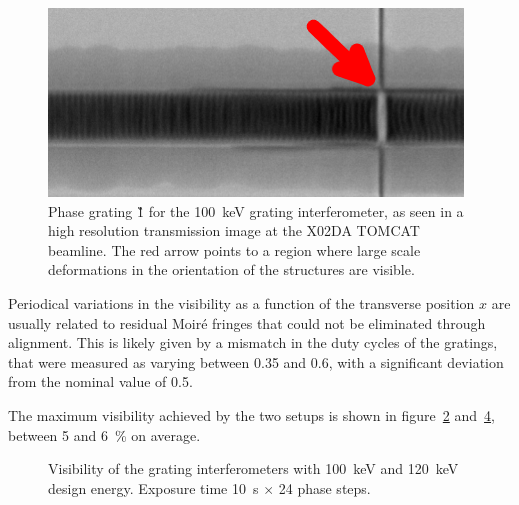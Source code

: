 \begin{figure}[htb]
    \centering
    \includegraphics[width=\textwidth]{gfx/mythen-edge-on/tomcat-grating.png}
    \caption{Phase grating \G1 for the \SI{100}{\kilo\eV} grating
interferometer, as seen in a high resolution transmission image at the X02DA
TOMCAT beamline. The red arrow points to a region where large scale
deformations in the orientation of the structures are visible.}
    \label{fig:defects-tomcat}
\end{figure}

Periodical variations in the visibility as a function of the transverse
position $x$ are usually related to residual Moir\'e fringes that could not
be eliminated through alignment. This is likely given by a mismatch in the
duty cycles of the gratings, that were measured as varying between 
\num{0.35} and \num{0.6}, with a significant deviation from the nominal value
of \num{0.5}.

The maximum visibility achieved by the two setups is shown in 
figure~\ref{fig:visibility100} and~\ref{fig:visibility120}, between \num{5} and
\SI{6}{\percent} on average.

\begin{figure}[h!]
    \centering
    \begin{subfigure}[b]{.49\textwidth}
        \resizebox{\textwidth}{!}{}
        \caption{}
        \label{fig:visibility100}
    \end{subfigure}
    \begin{subfigure}[b]{.49\textwidth}
        \resizebox{\textwidth}{!}{}
        \caption{}
        \label{fig:visibility120}
    \end{subfigure}
    \caption{Visibility of the grating
        interferometers with
        \SI{100}{\kilo\eV} and \SI{120}{\kilo\eV} design energy. Exposure time \SI{10}{\second}
        $\times$ \num{24} phase steps.}
\end{figure}


